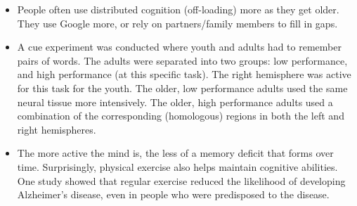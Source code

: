 \documentclass[]{article}
\begin{document}
\begin{itemize}
				\item People often use distributed cognition (off-loading) more as they get older. They use Google more, or rely on partners/family members to fill in gaps.
				\item A cue experiment was conducted where youth and adults had to remember pairs of words. The adults were separated into two groups: low performance, and high performance (at this specific task). The right hemisphere was active for this task for the youth. The older, low performance adults used the same neural tissue more intensively. The older, high performance adults used a combination of the corresponding (homologous) regions in both the left and right hemispheres.
				\item The more active the mind is, the less of a memory deficit that forms over time. Surprisingly, physical exercise also helps maintain cognitive abilities. One study showed that regular exercise reduced the likelihood of developing Alzheimer's disease, even in people who were predisposed to the disease.
			\end{itemize}
			
\end{document}
